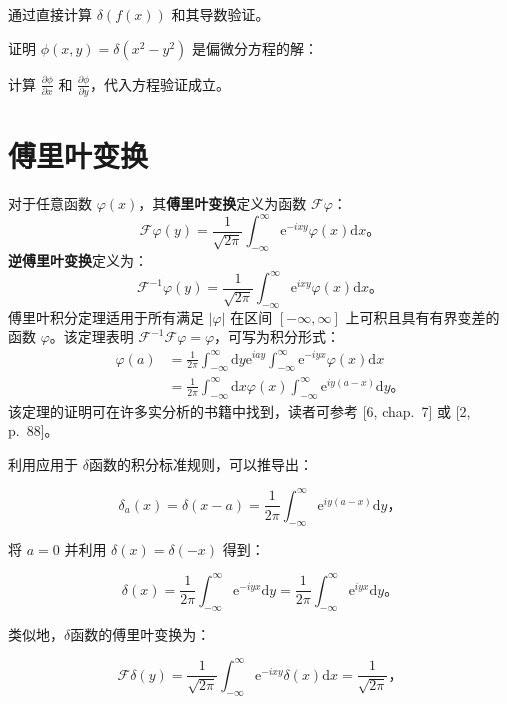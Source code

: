 通过直接计算 $\delta(f(x))$ 和其导数验证。

证明 $\phi(x, y) = \delta(x^2 - y^2)$ 是偏微分方程的解：

计算 $\frac{\partial \phi}{\partial x}$ 和
$\frac{\partial \phi}{\partial y}$，代入方程验证成立。

\section{傅里叶变换}\label{12.3}

对于任意函数 $\varphi(x)$，其\textbf{傅里叶变换}定义为函数
$\mathcal{F} \varphi$：
 $$
\mathcal{F} \varphi(y)=\frac{1}{\sqrt{2 \pi}} \int_{-\infty}^\infty \mathrm{e}^{-i x y} \varphi(x) \mathrm{d}x。
$$
\textbf{逆傅里叶变换}定义为：
 $$
\mathcal{F}^{-1} \varphi(y)=\frac{1}{\sqrt{2 \pi}} \int_{-\infty}^\infty \mathrm{e}^{i x y} \varphi(x) \mathrm{d}x。
$$
傅里叶积分定理适用于所有满足 $|\varphi|$ 在区间 $[-\infty, \infty]$
上可积且具有有界变差的函数 $\varphi$。该定理表明
$\mathcal{F}^{-1} \mathcal{F} \varphi=\varphi$，可写为积分形式：
 $$
\begin{aligned}
\varphi(a) & =\frac{1}{2 \pi} \int_{-\infty}^\infty \mathrm{d}y \mathrm{e}^{i a y} \int_{-\infty}^\infty \mathrm{e}^{-i y x} \varphi(x) \mathrm{d}x \\
& =\frac{1}{2 \pi} \int_{-\infty}^\infty \mathrm{d}x \varphi(x) \int_{-\infty}^\infty \mathrm{e}^{i y(a-x)} \mathrm{d}y。
\end{aligned}
$$
该定理的证明可在许多实分析的书籍中找到，读者可参考 {[}6, chap.~7{]} 或
{[}2, p.~88{]}。

利用应用于 $\delta$函数的积分标准规则，可以推导出：

\begin{equation}\label{eq:12.10} 
 \delta_a(x) = \delta(x-a) = \frac{1}{2 \pi} \int_{-\infty}^\infty \mathrm{e}^{i y(a-x)} \mathrm{d}y， 
 \end{equation}

将 $a=0$ 并利用 $\delta(x)=\delta(-x)$ 得到：

\begin{equation}\label{eq:12.11} 
 \delta(x)=\frac{1}{2 \pi} \int_{-\infty}^\infty \mathrm{e}^{-i y x} \mathrm{d}y = \frac{1}{2 \pi} \int_{-\infty}^\infty \mathrm{e}^{i y x} \mathrm{d}y。 
 \end{equation}

类似地，$\delta$函数的傅里叶变换为：

\begin{equation}\label{eq:12.12} 
 \mathcal{F} \delta(y)=\frac{1}{\sqrt{2 \pi}} \int_{-\infty}^\infty \mathrm{e}^{-i x y} \delta(x) \mathrm{d}x = \frac{1}{\sqrt{2 \pi}}， 
 \end{equation}


